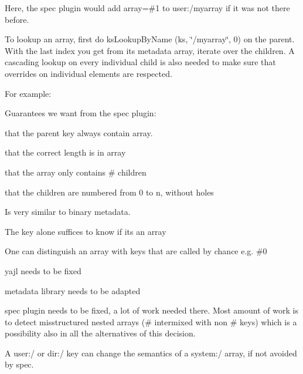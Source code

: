 Here, the {\ttfamily spec} plugin would add {\ttfamily array=\#1} to {\ttfamily user\+:/myarray} if it was not there before.

To lookup an array, first do {\ttfamily ks\+Lookup\+By\+Name (ks, \char`\"{}/myarray\char`\"{}, 0)} on the parent. With the last index you get from its metadata {\ttfamily array}, iterate over the children. A cascading lookup on every individual child is also needed to make sure that overrides on individual elements are respected.

For example\+:




Guarantees we want from the spec plugin\+:


\begin{DoxyItemize}
\item that the parent key always contain {\ttfamily array}.
\item that the correct length is in {\ttfamily array}
\item that the array only contains {\ttfamily \#} children
\item that the children are numbered from 0 to n, without holes
\end{DoxyItemize}


\begin{DoxyItemize}
\item Is very similar to {\ttfamily binary} metadata.
\item The key alone suffices to know if its an array
\item One can distinguish an array with keys that are called by chance e.\+g. {\ttfamily \#0}
\end{DoxyItemize}


\begin{DoxyItemize}
\item yajl needs to be fixed
\item metadata library needs to be adapted
\item spec plugin needs to be fixed, a lot of work needed there. Most amount of work is to detect misstructured nested arrays ({\ttfamily \#} intermixed with non {\ttfamily \#} keys) which is a possibility also in all the alternatives of this decision.
\item A {\ttfamily user\+:/} or {\ttfamily dir\+:/} key can change the semantics of a {\ttfamily system\+:/} array, if not avoided by {\ttfamily spec}.
\end{DoxyItemize}


